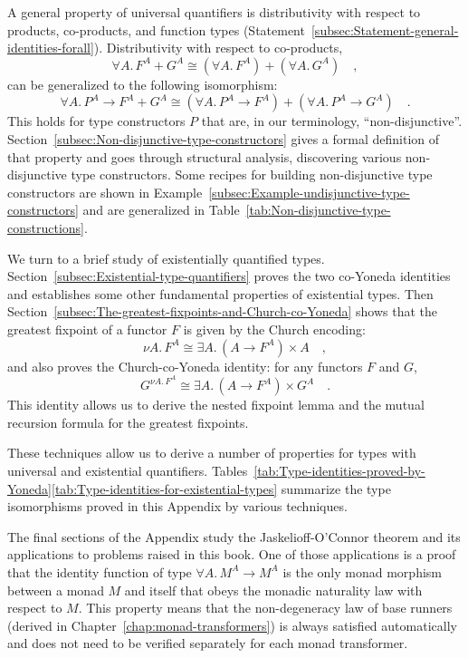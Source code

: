 A general property of universal quantifiers is distributivity with
respect to products, co-products, and function types (Statement~\ref{subsec:Statement-general-identities-forall}).
Distributivity with respect to co-products, 
\[
\forall A.\,F^{A}+G^{A}\cong(\forall A.\,F^{A})+(\forall A.\,G^{A})\quad,
\]
can be generalized to the following isomorphism:
\[
\forall A.\,P^{A}\rightarrow F^{A}+G^{A}\cong(\forall A.\,P^{A}\rightarrow F^{A})+(\forall A.\,P^{A}\rightarrow G^{A})\quad.
\]
This holds for type constructors $P$ that are, in our terminology,
\textsf{``}non-disjunctive\textsf{''}. Section~\ref{subsec:Non-disjunctive-type-constructors}
gives a formal definition of that property and goes through structural
analysis, discovering various non-disjunctive type constructors. Some
recipes for building non-disjunctive type constructors are shown in
Example~\ref{subsec:Example-undisjunctive-type-constructors} and
are generalized in Table~\ref{tab:Non-disjunctive-type-constructions}.

We turn to a brief study of existentially quantified types. Section~\ref{subsec:Existential-type-quantifiers}
proves the two co-Yoneda identities and establishes some other fundamental
properties of existential types. Then Section~\ref{subsec:The-greatest-fixpoints-and-Church-co-Yoneda}
shows that the greatest fixpoint of a functor $F$ is given by the
Church encoding:
\[
\nu A.\,F^{A}\cong\exists A.\,(A\rightarrow F^{A})\times A\quad,
\]
and also proves the Church-co-Yoneda identity: for any functors $F$
and $G$,
\[
G^{\nu A.\,F^{A}}\cong\exists A.\,(A\rightarrow F^{A})\times G^{A}\quad.
\]
This identity allows us to derive the nested fixpoint lemma and the
mutual recursion formula for the greatest fixpoints.

These techniques allow us to derive a number of properties for types
with universal and existential quantifiers. Tables~\ref{tab:Type-identities-proved-by-Yoneda}\textendash \ref{tab:Type-identities-for-existential-types}
summarize the type isomorphisms proved in this Appendix by various
techniques.

The final sections of the Appendix study the Jaskelioff-O\textsf{'}Connor theorem
and its applications to problems raised in this book. One of those
applications is a proof that the identity function of type $\forall A.\,M^{A}\rightarrow M^{A}$
is the only monad morphism between a monad $M$ and itself that obeys
the monadic naturality law with respect to $M$. This property means
that the non-degeneracy law of base runners (derived in Chapter~\ref{chap:monad-transformers})
is always satisfied automatically and does not need to be verified
separately for each monad transformer.

